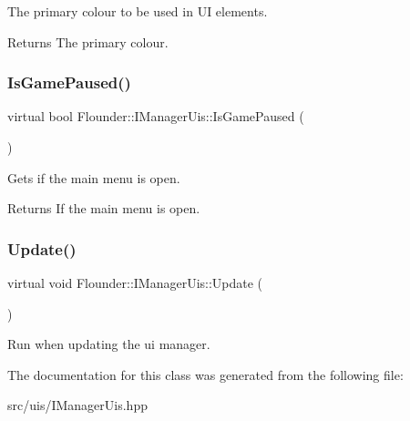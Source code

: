 The primary colour to be used in UI elements. 

\begin{DoxyReturn}{Returns}
The primary colour. 
\end{DoxyReturn}
\mbox{\label{class_flounder_1_1_i_manager_uis_a010e82af8ea04509c55de7b797c9e4ed}} 
\subsubsection{\texorpdfstring{Is\+Game\+Paused()}{IsGamePaused()}}
{\footnotesize\ttfamily virtual bool Flounder\+::\+I\+Manager\+Uis\+::\+Is\+Game\+Paused (\begin{DoxyParamCaption}{ }\end{DoxyParamCaption})\hspace{0.3cm}{\ttfamily [pure virtual]}}



Gets if the main menu is open. 

\begin{DoxyReturn}{Returns}
If the main menu is open. 
\end{DoxyReturn}
\mbox{\label{class_flounder_1_1_i_manager_uis_a96b05bd809a74fb4ad2203e683d5f53e}} 
\subsubsection{\texorpdfstring{Update()}{Update()}}
{\footnotesize\ttfamily virtual void Flounder\+::\+I\+Manager\+Uis\+::\+Update (\begin{DoxyParamCaption}{ }\end{DoxyParamCaption})\hspace{0.3cm}{\ttfamily [pure virtual]}}



Run when updating the ui manager. 



The documentation for this class was generated from the following file\+:\begin{DoxyCompactItemize}
\item 
src/uis/I\+Manager\+Uis.\+hpp\end{DoxyCompactItemize}

